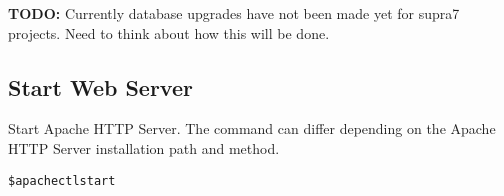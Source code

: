 \documentclass[12pt]{article}
\newcommand{\vigShowNotes}{1}
\newcommand{\todo}[1]{
\textbf{TODO:} 
#1
}
\begin{document}
\todo{Currently database upgrades have not been made yet for supra7 projects. Need to think about how this will be done.}

\subsection{Start Web Server}
Start Apache HTTP Server. The command can differ depending on the Apache HTTP Server installation path and method.

\begin{alltt}
\$ apachectl start
\end{alltt}
\end{document}
